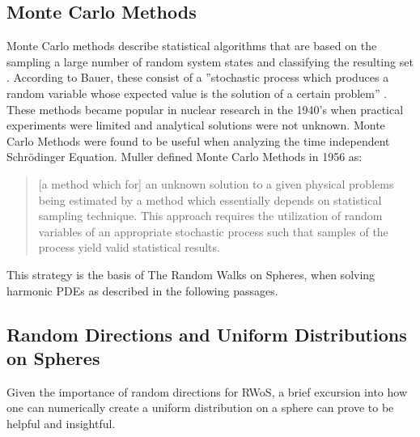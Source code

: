 \subsection{Monte Carlo Methods}\label{sssec:montecarlo}
Monte Carlo methods describe statistical algorithms that are based on the sampling a
large number of random system states and classifying the resulting set \cite{Metropolis}.
According to Bauer, these consist of a ''stochastic process which produces a random variable
 whose expected value is the solution of a certain problem'' \cite{bauer}.
These methods became popular in nuclear research in the 1940's when practical
experiments were limited and analytical solutions were not unknown.  Monte Carlo
Methods were found to be useful when analyzing the time independent Schrödinger
Equation\cite{Metropolis}. Muller defined Monte Carlo Methods in 1956 as:
\begin{quote}[a method which for] an unknown solution to a given physical
problems being estimated by a method which essentially depends on statistical sampling technique.
This approach requires the utilization of random variables of an appropriate
stochastic process such that samples of the process yield valid statistical
results\cite{Muller}.\end{quote}
This strategy is the basis of The Random Walks on Spheres, when solving harmonic
\Glspl{PDE} as described in the following passages.
\subsection{Random Directions and Uniform Distributions on Spheres}
Given the importance of random directions for \Gls{RWoS}, a brief excursion
into how one can numerically create a uniform distribution on a sphere can prove
to be helpful and insightful.
\cite{Yang,Muller1959,marsaglia1972}


